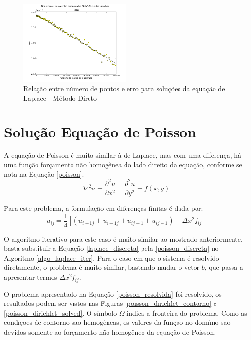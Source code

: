 \documentclass[journal]{IEEEtran}
\begin{document}
\begin{figure}[ht!]
\centering
\includegraphics[width = 0.5\textwidth]{figures/erro_metodo_direto.png}
\caption{Relação entre número de pontos e erro para soluções da equação de Laplace - Método Direto\label{erro_metodo_direto_laplace}}
\end{figure}
\section{Solução Equação de Poisson}

A equação de Poisson é muito similar à de Laplace, mas com uma diferença, há uma função forçamento não homogênea do lado direito da equação, conforme se nota na Equação \ref{poisson}.
\begin{equation}
  \nabla^2 u=\frac{\partial^2 u}{\partial x^2}+\frac{\partial^2 u}{\partial y^2}=f(x,y)\label{poisson}
\end{equation}

Para este problema, a formulação em diferenças finitas é dada por:
\begin{equation}
u_{ij}=\frac{1}{4}[(u_{i+1j}+u_{i-1j}+u_{ij+1}+u_{ij-1})-\Delta x^2 f_{ij}] \label{poisson_discreta}
\end{equation}

O algoritmo iterativo para este caso é muito similar ao mostrado anteriormente, basta substituir a Equação \ref{laplace_discreta} pela \ref{poisson_discreta} no Algoritmo \ref{algo_laplace_iter}. Para o caso em que o sistema é resolvido diretamente, o problema é muito similar, bastando mudar o vetor $b$, que passa a apresentar termos $\Delta x^2 f_{ij}$.

O problema apresentado na Equação \ref{poisson_resolvida} foi resolvido, os resultados podem ser vistos nas Figuras \ref{poisson_dirichlet_contorno} e \ref{poisson_dirichlet_solved}. O símbolo $\Omega$ indica a fronteira do problema. Como as condições de contorno são homogêneas, os valores da função no domínio são devidos somente ao forçamento não-homogêneo da equação de Poisson.
\end{document}

